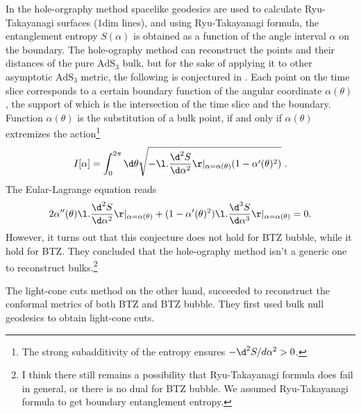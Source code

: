 \documentclass[12pt]{article}
\begin{document}
In the hole-orgraphy method spacelike geodesics are used to calculate Ryu-Takayanagi surfaces (1dim lines), and using Ryu-Takayanagi formula, the entanglement entropy $S(\alpha)$ is obtained as a function of the angle interval $\alpha$ on the boundary.
The hole-ography method can reconstruct the points and their distances of the pure $\mathrm{AdS}_3$ bulk, but for the sake of applying it to other asymptotic $\mathrm{AdS}_3$ metric, the following is conjectured in \cite{Czech:2014ppa}.
Each point on the time slice corresponds to a certain boundary function of the angular coordinate $\alpha(\theta)$, the support of which is the intersection of the time slice and the boundary.
Function $\alpha(\theta)$ is the substitution of a bulk point, if and only if $\alpha(\theta)$ extremizes the action\footnote{The strong subadditivity of the entropy ensures $-\d^2S/d\alpha^2 > 0$.}
\begin{align}
	I[\alpha] = \int_0^{2\pi}\d\theta \sqrt{-\l. \frac{\d^2S}{\d\alpha^2}\r |_{\alpha = \alpha(\theta)}(1-\alpha'(\theta)^2)}~.
\end{align}
The Eular-Lagrange equation reads
\begin{align}
	2\alpha''(\theta)\l.\frac{\d^2S}{\d\alpha^2}\r|_{\alpha = \alpha(\theta)} + (1-\alpha'(\theta)^2)\l.\frac{\d^3S}{\d\alpha^3}\r|_{\alpha = \alpha(\theta)} = 0.
\end{align}
However, it turns out that this conjecture does not hold for BTZ bubble, while it hold for BTZ.
They concluded that the hole-ography method isn't a generic one to reconstruct bulks.\footnote{I think there still remains a possibility that Ryu-Takayanagi formula does fail in general, or there is no dual for BTZ bubble. We assumed Ryu-Takayanagi formula to get boundary entanglement entropy.}

The light-cone cuts method on the other hand, succeeded to reconstruct the conformal metrics of both BTZ and BTZ bubble.
They first used bulk null geodesics to obtain light-cone cuts.
%




 

\end{document}
